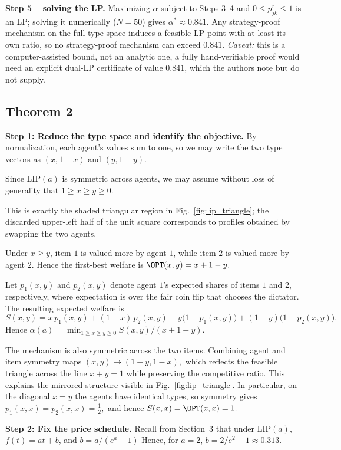 \textbf{Step 5 -- solving the LP.} Maximizing $\alpha$ subject to Steps 3--4
and $0\le p^r_{jk}\le1$ is an LP; solving it numerically ($N=50$) gives
$\alpha^*\approx0.841$. Any strategy-proof mechanism on the full type space
induces a feasible LP point with at least its own ratio, so no strategy-proof
mechanism can exceed $0.841$. \emph{Caveat:} this is a computer-assisted
bound, not an analytic one, a fully hand-verifiable proof would need an
explicit dual-LP certificate of value $0.841$, which the authors note but do
not supply.

\subsection{Theorem 2}
\textbf{Step 1: Reduce the type space and identify the objective.}
By normalization, each agent's values sum to one, so we may write the two type vectors as $(x,1-x)$ and $(y,1-y).$

Since $\mathrm{LIP}(a)$ is symmetric across agents, we may assume without loss of generality that $1\ge x\ge y\ge 0.$

This is exactly the shaded triangular region in Fig.~\ref{fig:lip_triangle}; the discarded upper-left half of the unit square corresponds to profiles obtained by swapping the two agents.

Under $x\ge y$, item $1$ is valued more by agent $1$, while item $2$ is valued
more by agent $2$. Hence the first-best welfare is $\OPT(x,y)=x+1-y.$

Let $p_1(x,y)$ and $p_2(x,y)$ denote agent $1$'s expected shares of items $1$ and $2$, respectively, where expectation is over the fair coin flip that chooses the dictator. The resulting expected welfare is
\[
S(x,y)
=x\,p_1(x,y)+(1-x)\,p_2(x,y)
+y\bigl(1-p_1(x,y)\bigr)
+(1-y)\bigl(1-p_2(x,y)\bigr).
\]
Hence $\alpha(a)
= \min_{1\ge x\ge y\ge0} {S(x,y)}/({x+1-y}).$

The mechanism is also symmetric across the two items. Combining agent and item symmetry maps $(x,y)\mapsto(1-y,1-x),$ which reflects the feasible triangle across the line $x+y=1$ while preserving the competitive ratio. This explains the mirrored structure visible in Fig.~\ref{fig:lip_triangle}. In particular, on the diagonal $x=y$ the agents
have identical types, so symmetry gives $p_1(x,x)=p_2(x,x)=\frac12,$ and hence $S(x,x)=\OPT(x,x)=1.$

\textbf{Step 2: Fix the price schedule.}
Recall from Section~3 that under $\mathrm{LIP}(a)$, $f(t)=at+b$, and $b={a}/({e^a-1})$ Hence, for $a=2$, $b={2}/{e^2-1}\approx 0.313$.

